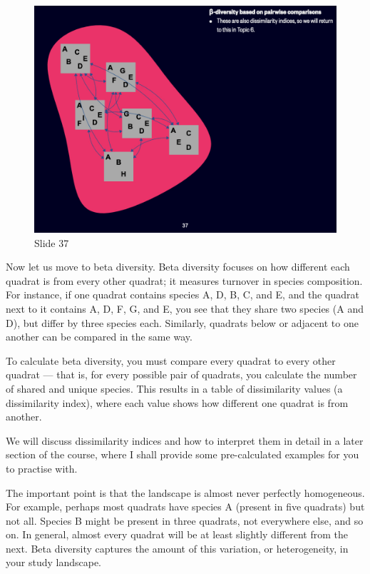 \documentclass[
  12pt,
]{book}
\begin{document}
\begin{figure}[ht]
\centering
\includegraphics[width=0.8\linewidth]{../images/BDC334/BDC334-037.jpeg}
\caption*{Slide 37}
\end{figure}

Now let us move to beta diversity. Beta diversity focuses on how
different each quadrat is from every other quadrat; it measures turnover
in species composition. For instance, if one quadrat contains species A,
D, B, C, and E, and the quadrat next to it contains A, D, F, G, and E,
you see that they share two species (A and D), but differ by three
species each. Similarly, quadrats below or adjacent to one another can
be compared in the same way.

To calculate beta diversity, you must compare every quadrat to every
other quadrat --- that is, for every possible pair of quadrats, you
calculate the number of shared and unique species. This results in a
table of dissimilarity values (a dissimilarity index), where each value
shows how different one quadrat is from another.

We will discuss dissimilarity indices and how to interpret them in
detail in a later section of the course, where I shall provide some
pre-calculated examples for you to practise with.

The important point is that the landscape is almost never perfectly
homogeneous. For example, perhaps most quadrats have species A (present
in five quadrats) but not all. Species B might be present in three
quadrats, not everywhere else, and so on. In general, almost every
quadrat will be at least slightly different from the next. Beta
diversity captures the amount of this variation, or heterogeneity, in
your study landscape.
\end{document}
